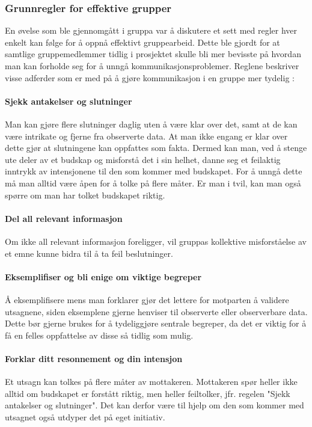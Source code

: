 \subsubsection{Grunnregler for effektive grupper}

En øvelse som ble gjennomgått i gruppa var å diskutere et sett med regler hver enkelt kan følge for å oppnå effektivt gruppearbeid.
Dette ble gjordt for at samtlige gruppemedlemmer tidlig i prosjektet skulle bli mer bevisste på hvordan man kan forholde seg for å unngå kommunikasjonsproblemer.
Reglene beskriver visse adferder som er med på å gjøre kommunikasjon i en gruppe mer tydelig \cite{schwarz}:

\paragraph{Sjekk antakelser og slutninger}
Man kan gjøre flere slutninger daglig uten å være klar over det, samt at de kan være intrikate og fjerne fra observerte data.
At man ikke engang er klar over dette gjør at slutningene kan oppfattes som fakta.
Dermed kan man, ved å stenge ute deler av et budskap og misforstå det i sin helhet, danne seg et feilaktig inntrykk av intensjonene til den som kommer med budskapet.
For å unngå dette må man alltid være åpen for å tolke på flere måter.
Er man i tvil, kan man også spørre om man har tolket budskapet riktig.

\paragraph{Del all relevant informasjon}
Om ikke all relevant informasjon foreligger, vil gruppas kollektive misforståelse av et emne kunne bidra til å ta feil beslutninger.

\paragraph{Eksemplifiser og bli enige om viktige begreper}
Å eksemplifisere mens man forklarer gjør det lettere for motparten å validere utsagnene, siden eksemplene gjerne henviser til observerte eller observerbare data.
Dette bør gjerne brukes for å tydeliggjøre sentrale begreper, da det er viktig for å få en felles oppfattelse av disse så tidlig som mulig.

\paragraph{Forklar ditt resonnement og din intensjon}
Et utsagn kan tolkes på flere måter av mottakeren.
Mottakeren spør heller ikke alltid om budskapet er forstått riktig, men heller feiltolker, jfr. regelen "Sjekk antakelser og slutninger".
Det kan derfor være til hjelp om den som kommer med utsagnet også utdyper det på eget initiativ.

